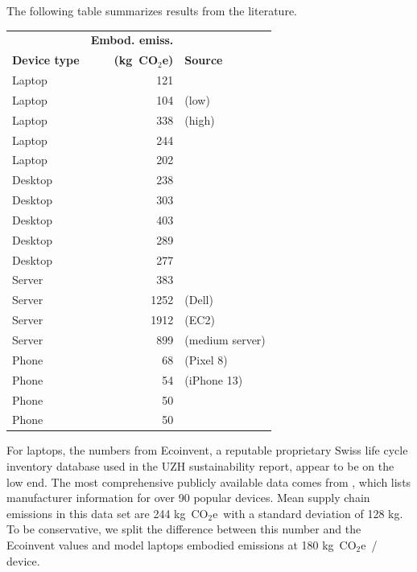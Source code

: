 \documentclass[11pt]{article}
\newcommand{\coe}{CO$_2$e}
\newcommand{\gcoe}{g~\coe}
\newcommand{\kgcoe}{k\gcoe}
\begin{document}
The following table summarizes results from the literature.

\begin{center}
  \begin{tabular}{|l|r|l|}
    \hline
    & \textbf{Embod. emiss.} & \\
    \textbf{Device type} & \textbf{(\kgcoe)} & \textbf{Source} \\ \hline
    Laptop & 121 & \textcite{ecoinvent}  \\ \hline
    Laptop & 104 & \textcite{teehan2013} (low) \\ \hline
    Laptop & 338 & \textcite{teehan2013} (high) \\ \hline
    Laptop & 244 & \textcite{rarecoil} \\ \hline
    Laptop & 202 & \textcite{unctadder2024} \\ \hline
    Desktop & 238 & \textcite{ecoinvent} \\ \hline
    Desktop & 303 & \textcite{teehan2013} \\ \hline
    Desktop & 403 & \textcite{unctadder2024} \\ \hline
    Desktop & 289 & \textcite{dellpcf} \\ \hline
    Desktop & 277 & \textcite{boavizta:api} \\ \hline
    Server & 383 & \textcite{teehan2013} \\ \hline
    Server & 1252 & \textcite{davy2021} (Dell) \\ \hline
    Server & 1912 & \textcite{davy2021} (EC2) \\ \hline
    Server & 899 & \textcite{boavizta:api} (medium server)\\ \hline
    Phone & 68 & \textcite{googlepixel8} (Pixel 8)\\ \hline
    Phone & 54 & \textcite{appleiphone13} (iPhone 13)\\ \hline
    Phone & 50 & \textcite{unctadder2024} \\ \hline
    Phone & 50 & \textcite{lovehagen2023} \\ \hline
    \end{tabular}
  \label{tab:embodied_emissions}
\end{center}

For laptops, the numbers from Ecoinvent, a reputable proprietary Swiss life
cycle inventory database used in the UZH sustainability report, appear to be on
the low end. The most comprehensive publicly available data comes from
\textcite{rarecoil}, which lists manufacturer information for over 90 popular
devices. Mean supply chain emissions in this data set are 244 \kgcoe\ with a
standard deviation of 128 kg. To be conservative, we split the difference
between this number and the Ecoinvent values and model laptops embodied
emissions at 180 \kgcoe\ / device.
\end{document}
